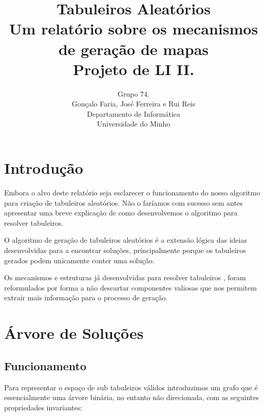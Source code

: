 \documentclass[a4paper]{report} %
\begin{document}
\title{Tabuleiros Aleatórios\\ \large{Um relatório sobre os mecanismos de geração de mapas \\ Projeto de LI II.}}

\author{Grupo 74. \\ Gonçalo Faria, José Ferreira e Rui Reis \\ Departamento de Informática \\ Universidade do Minho}
\date{}


\maketitle

\tableofcontents

\chapter{Introdução}

Embora o alvo deste relatório seja esclarecer o funcionamento do nosso algoritmo para criação de tabuleiros aleatórios. Não o faríamos com sucesso sem antes apresentar uma breve explicação de como desenvolvemos o algoritmo para resolver tabuleiros.

O algoritmo de geração de tabuleiros aleatórios é a extensão lógica das ideias desenvolvidas para a encontrar soluções, principalmente porque os tabuleiros gerados podem unicamente conter uma solução.

Os mecanismos e estruturas já desenvolvidas para resolver tabuleiros , foram reformulados por forma a não descartar componentes valiosas que nos permitem extrair mais informação para o processo de geração.

\chapter{Árvore de Soluções}

\section{Funcionamento}

Para representar o espaço de sub tabuleiros válidos introduzimos um grafo que é essencialmente uma árvore binária, no entanto não direcionada, com as seguintes propriedades invariantes:
\end{document}
